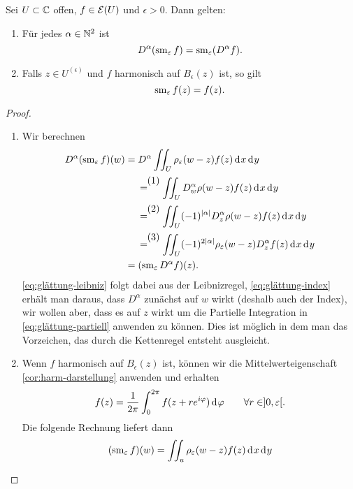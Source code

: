 \begin{lemma}
  \label{lemma:glättung-eigenschaften}
  Sei $U \subset \mathbb{C}$ offen, $f \in \mathcal{E}(U)$ und $\epsilon > 0 $. Dann
  gelten:
  \begin{enumerate}
  \item Für jedes $\alpha \in \mathbb{N}^2$ ist
    \[
    D^\alpha( \operatorname{sm}_\varepsilon f) =
    \operatorname{sm}_\varepsilon (D^\alpha f).
    \]
  \item Falls $z \in U^{(\epsilon)}$ und $f$ harmonisch auf
    $B_\epsilon(z)$ ist, so gilt
    \[
    \operatorname{sm}_\varepsilon f(z) = f(z).
    \]
  \end{enumerate}
\end{lemma}


\begin{proof}
  \begin{enumerate}
  \item Wir berechnen
    \begin{align*}
      D^\alpha (\sm_\epsilon f)(w) & = D^\alpha \iint_U \rho_\epsilon(w
      - z) f(z) \d[x] \d[y] \\
      & \stackrel{\tag{1}}{=} \iint_U D_w^\alpha \rho(w - z) f(z)
      \d[x] \d[y] \label{eq:glättung-leibniz}\\
      & \stackrel{\tag{2}}{=} \iint_U (-1)^{|\alpha|} D_z^\alpha
      \rho(w-z) f(z) \d[x] \d[y] \label{eq:glättung-index}\\
      & \stackrel{\tag{3}}{=} \iint_U (-1)^{2|\alpha|}
      \rho_\epsilon(w-z) D^\alpha_z f(z)
      \d[x]\d[y] \label{eq:glättung-partiell}\\
      & = (\sm_\epsilon D^\alpha f)(z).
    \end{align*}
    \eqref{eq:glättung-leibniz} folgt dabei aus der Leibnizregel,
    \eqref{eq:glättung-index} erhält man daraus, dass $D^\alpha$
    zunächst auf $w$ wirkt (deshalb auch der Index), wir wollen aber,
    dass es auf $z$ wirkt um die Partielle Integration in
    \eqref{eq:glättung-partiell} anwenden zu können. Dies ist möglich
    in dem man das Vorzeichen, das durch die Kettenregel entsteht
    ausgleicht.
  \item Wenn $f$ harmonisch auf $B_\epsilon(z)$ ist, können wir die
    Mittelwerteigenschaft \ref{cor:harm-darstellung} anwenden und erhalten
    \[
    f(z) = \frac{1}{2\pi} \int_0^{2\pi}f(z + re^{i\phi}) \d[\phi]
    \qquad \forall r \in ]0, \epsilon[.
    \]
    Die folgende Rechnung liefert dann 
    \begin{align}
      (\sm_\epsilon f)(w) & = \iint_u \rho_\epsilon(w- z) f(z)
      \d[x]\d[y] \nonumber\\

\end{align}
\end{enumerate}
\end{proof}
